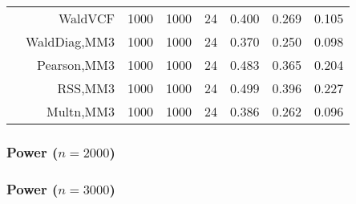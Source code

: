 \documentclass[
]{article}
\begin{document}
\begin{table}[H]
{\begin{tabular}[t]{lrrrrrrr}
\hspace{1em} & WaldVCF & 1000 & 1000 & 24 & 0.400 & 0.269 & 0.105\\

\hspace{1em} & WaldDiag,MM3 & 1000 & 1000 & 24 & 0.370 & 0.250 & 0.098\\

\hspace{1em} & Pearson,MM3 & 1000 & 1000 & 24 & 0.483 & 0.365 & 0.204\\

\hspace{1em} & RSS,MM3 & 1000 & 1000 & 24 & 0.499 & 0.396 & 0.227\\

\hspace{1em} & Multn,MM3 & 1000 & 1000 & 24 & 0.386 & 0.262 & 0.096\\
\bottomrule
\end{tabular}}
\endgroup{}
\end{table}

\hypertarget{power-n2000}{%
\subsubsection{\texorpdfstring{Power
(\(n=2000\))}{Power (n=2000)}}\label{power-n2000}}

\begin{table}[H]
\centering\begingroup\fontsize{7}{9}\selectfont

\endgroup{}
\end{table}

\hypertarget{power-n3000}{%
\subsubsection{\texorpdfstring{Power
(\(n=3000\))}{Power (n=3000)}}\label{power-n3000}}

\begin{table}[H]
\centering\begingroup\fontsize{7}{9}\selectfont

\endgroup{}
\end{table}
\end{document}
